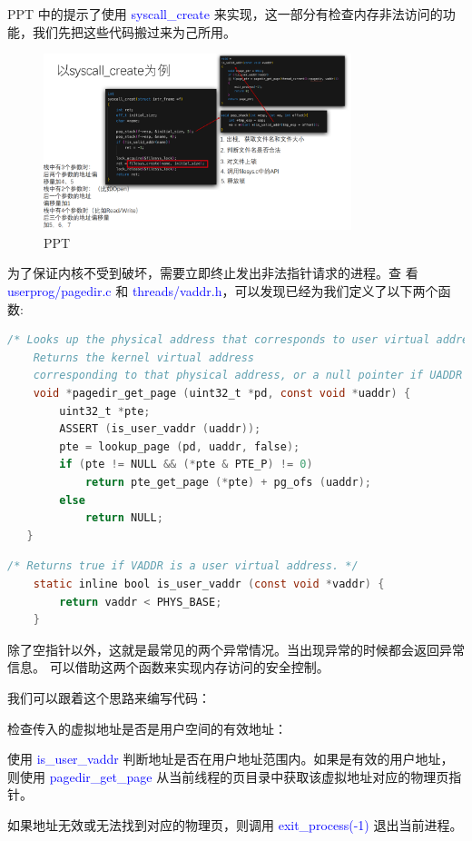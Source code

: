 \documentclass[14pt,a4paper,UTF8,twoside]{article}
\renewcommand{\texttt}[1]{\textcolor{blue}{\ttfamily #1}}
\begin{document}
PPT 中的提示了使用 \texttt{syscall\_create} 来实现，这一部分有检查内存非法访问的功能，我们先把这些代码搬过来为己所用。

\begin{figure}[H]
    \centering
    \includegraphics[width=0.8\textwidth]{img5/ppt.png}
    \caption{PPT}
    \label{fig:check}
\end{figure}

为了保证内核不受到破坏，需要立即终止发出非法指针请求的进程。查
看 \texttt{userprog/pagedir.c} 和 \texttt{threads/vaddr.h}，可以发现已经为我们定义了以下两个函数:

\begin{lstlisting}[language=C,title= pagedir\_get\_page()]
    /* Looks up the physical address that corresponds to user virtual address UADDR in PD.
    Returns the kernel virtual address
    corresponding to that physical address, or a null pointer if UADDR is unmapped. */
    void *pagedir_get_page (uint32_t *pd, const void *uaddr) {
        uint32_t *pte;
        ASSERT (is_user_vaddr (uaddr));
        pte = lookup_page (pd, uaddr, false);
        if (pte != NULL && (*pte & PTE_P) != 0)
            return pte_get_page (*pte) + pg_ofs (uaddr);
        else
            return NULL;
   }
\end{lstlisting}

\begin{lstlisting}[language=C,title= is\_user\_vaddr()]
    /* Returns true if VADDR is a user virtual address. */
    static inline bool is_user_vaddr (const void *vaddr) {
        return vaddr < PHYS_BASE;
    }
\end{lstlisting}

除了空指针以外，这就是最常见的两个异常情况。当出现异常的时候都会返回异常信息。
可以借助这两个函数来实现内存访问的安全控制。

我们可以跟着这个思路来编写代码：

\begin{cth}
检查传入的虚拟地址是否是用户空间的有效地址：

使用 \texttt{is\_user\_vaddr} 判断地址是否在用户地址范围内。如果是有效的用户地址，则使用 \texttt{pagedir\_get\_page} 从当前线程的页目录中获取该虚拟地址对应的物理页指针。

如果地址无效或无法找到对应的物理页，则调用 \texttt{exit\_process(-1)} 退出当前进程。
\end{cth}
\end{document}

